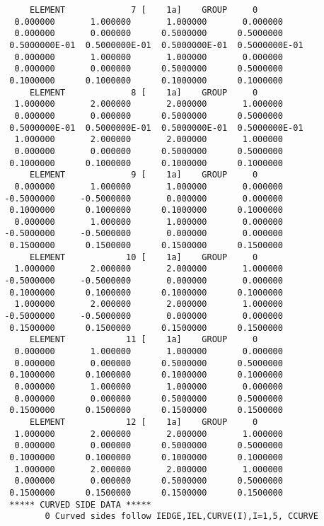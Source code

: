 \begin{verbatim}
      ELEMENT             7 [    1a]    GROUP     0
   0.000000       1.000000       1.000000       0.000000    
   0.000000       0.000000      0.5000000      0.5000000    
  0.5000000E-01  0.5000000E-01  0.5000000E-01  0.5000000E-01
   0.000000       1.000000       1.000000       0.000000    
   0.000000       0.000000      0.5000000      0.5000000    
  0.1000000      0.1000000      0.1000000      0.1000000    
      ELEMENT             8 [    1a]    GROUP     0
   1.000000       2.000000       2.000000       1.000000    
   0.000000       0.000000      0.5000000      0.5000000    
  0.5000000E-01  0.5000000E-01  0.5000000E-01  0.5000000E-01
   1.000000       2.000000       2.000000       1.000000    
   0.000000       0.000000      0.5000000      0.5000000    
  0.1000000      0.1000000      0.1000000      0.1000000    
      ELEMENT             9 [    1a]    GROUP     0
   0.000000       1.000000       1.000000       0.000000    
 -0.5000000     -0.5000000       0.000000       0.000000    
  0.1000000      0.1000000      0.1000000      0.1000000    
   0.000000       1.000000       1.000000       0.000000    
 -0.5000000     -0.5000000       0.000000       0.000000    
  0.1500000      0.1500000      0.1500000      0.1500000    
      ELEMENT            10 [    1a]    GROUP     0
   1.000000       2.000000       2.000000       1.000000    
 -0.5000000     -0.5000000       0.000000       0.000000    
  0.1000000      0.1000000      0.1000000      0.1000000    
   1.000000       2.000000       2.000000       1.000000    
 -0.5000000     -0.5000000       0.000000       0.000000    
  0.1500000      0.1500000      0.1500000      0.1500000    
      ELEMENT            11 [    1a]    GROUP     0
   0.000000       1.000000       1.000000       0.000000    
   0.000000       0.000000      0.5000000      0.5000000    
  0.1000000      0.1000000      0.1000000      0.1000000    
   0.000000       1.000000       1.000000       0.000000    
   0.000000       0.000000      0.5000000      0.5000000    
  0.1500000      0.1500000      0.1500000      0.1500000    
      ELEMENT            12 [    1a]    GROUP     0
   1.000000       2.000000       2.000000       1.000000    
   0.000000       0.000000      0.5000000      0.5000000    
  0.1000000      0.1000000      0.1000000      0.1000000    
   1.000000       2.000000       2.000000       1.000000    
   0.000000       0.000000      0.5000000      0.5000000    
  0.1500000      0.1500000      0.1500000      0.1500000    
  ***** CURVED SIDE DATA *****
         0 Curved sides follow IEDGE,IEL,CURVE(I),I=1,5, CCURVE

\end{verbatim}
